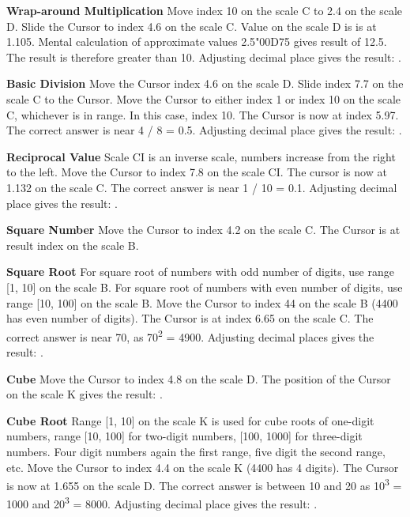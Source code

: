 \begin{multicols*}{3}
{  \textbf{Wrap-around Multiplication}
Move index 10 on the scale C to 2.4 on the scale D.
Slide the Cursor to index 4.6 on the scale C.
Value on the scale D is is at 1.105.
Mental calculation of approximate values 2.5{\char"00D7}5 gives result of 12.5.
The result is therefore greater than 10.
Adjusting decimal place gives the result: . 

  \textbf{Basic Division}
Move the Cursor index 4.6 on the scale D.
Slide index 7.7 on the scale C to the Cursor.
Move the Cursor to either index 1 or index 10 on the scale C, whichever is in range. In this case, index 10.
The Cursor is now at index 5.97. The correct answer is near 4 / 8 = 0.5. Adjusting decimal place gives the result: .

  \textbf{Reciprocal Value}
\footnotesize Scale CI is an inverse scale, numbers increase from the right to the left. \normalsize
Move the Cursor to index 7.8 on the scale CI.
The cursor is now at 1.132 on the scale C.
The correct answer is near 1 / 10 = 0.1. Adjusting decimal place gives the result: .

  \textbf{Square Number}
Move the Cursor to index 4.2 on the scale C.
The Cursor is at result index  on the scale B.

  \textbf{Square Root}
\footnotesize For square root of numbers with odd number of digits, use range [1, 10] on the scale B. For square root of numbers with even number of digits, use range [10, 100] on the scale B. \normalsize
{}
Move the Cursor to index 44 on the scale B (4400 has even number of digits).
The Cursor is at index 6.65 on the scale C. The correct answer is near 70, as 70\textsuperscript{2} = 4900. Adjusting decimal places gives the result: .

  \textbf{Cube}
Move the Cursor to index 4.8 on the scale D.
The position of the Cursor on the scale K gives the result: .

  \textbf{Cube Root}
\footnotesize Range [1, 10] on the scale K is used for cube roots of one-digit numbers, range [10, 100] for two-digit numbers, [100, 1000] for three-digit numbers. Four digit numbers again the first range, five digit the second range, etc. \normalsize
{}
Move the Cursor to index 4.4 on the scale K (4400 has 4 digits).
The Cursor is now at 1.655 on the scale D.
The correct answer is between 10 and 20 as 10\textsuperscript{3} = 1000 and 20\textsuperscript{3} = 8000. Adjusting decimal place gives the result: .

}
\end{multicols*}
